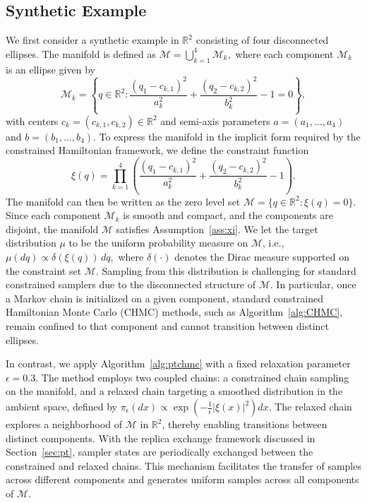 \documentclass[12pt]{article}
\begin{document}
\subsection{Synthetic Example}\label{C1}
We first consider a synthetic example in $\mathbb{R}^2$ consisting of four disconnected ellipses. The manifold is defined as
\(
\mathcal{M} = \bigcup_{k=1}^{4} \mathcal{M}_k,
\)
where each component $\mathcal{M}_k$ is an ellipse given by
\[
\mathcal{M}_k = \left\{ q \in \mathbb{R}^2 : 
\frac{(q_1 - c_{k,1})^2}{a_k^2} + \frac{(q_2 - c_{k,2})^2}{b_k^2} - 1 = 0 \right\},
\]
with centers $c_k = (c_{k,1}, c_{k,2}) \in \mathbb{R}^2$ and semi-axis parameters 
$a = (a_1,\dots,a_4)$ and $b = (b_1,\dots,b_4)$.
To express the manifold in the implicit form required by the constrained Hamiltonian framework, we define the constraint function
\[
\xi(q) = \prod_{k=1}^{4} \left( 
\frac{(q_1 - c_{k,1})^2}{a_k^2} + \frac{(q_2 - c_{k,2})^2}{b_k^2} - 1 
\right).
\]
The manifold can then be written as the zero level set
\(
\mathcal{M} = \{ q \in \mathbb{R}^2 : \xi(q) = 0 \}.
\)
Since each component $\mathcal{M}_k$ is smooth and compact, and the components are disjoint, the manifold $\mathcal{M}$ satisfies Assumption~\ref{ass:xi}.
We let the target distribution $\mu$ to be the uniform probability measure on $\mathcal{M}$, i.e.,
\(
\mu(dq) \propto \delta(\xi(q)) \, dq,
\)
where $\delta(\cdot)$ denotes the Dirac measure supported on the constraint set $\mathcal{M}$.
Sampling from this distribution is challenging for standard constrained samplers due to the disconnected structure of $\mathcal{M}$. In particular, once a Markov chain is initialized on a given component, standard constrained Hamiltonian Monte Carlo (CHMC) methods, such as Algorithm~\ref{alg:CHMC}, remain confined to that component and cannot transition between distinct ellipses.

In contrast, we apply Algorithm~\ref{alg:ptchmc} with a fixed relaxation parameter $\epsilon = 0.3$. The method employs two coupled chains: a constrained chain sampling on the manifold, and a relaxed chain targeting a smoothed distribution in the ambient space, defined by $\pi_\epsilon(dx) \propto \exp\left(-\frac{1}{\epsilon}|\xi(x)|^2\right) dx$. The relaxed chain explores a neighborhood of $\mathcal{M}$ in $\mathbb{R}^2$, thereby enabling transitions between distinct components.
With the replica exchange framework discussed in Section~\ref{sec:pt}, sampler states are periodically exchanged between the constrained and relaxed chains. This mechanism facilitates the transfer of samples across different components and generates uniform samples across all components of $\mathcal{M}$.
\end{document}
